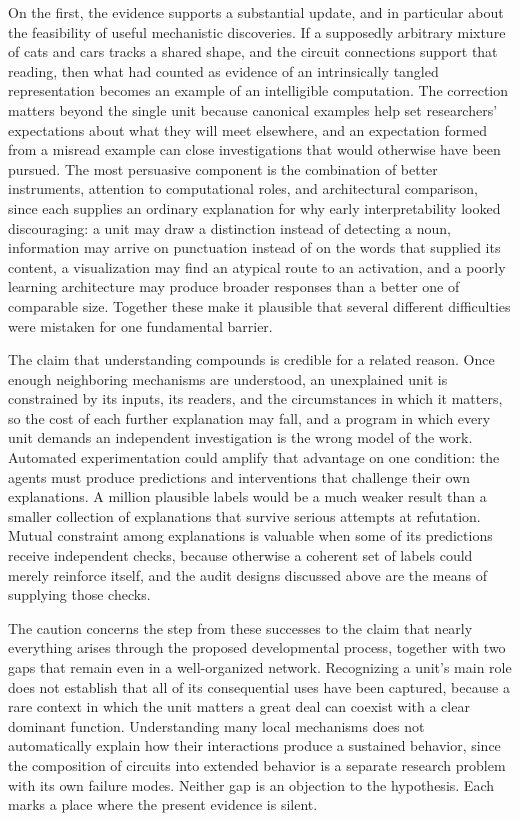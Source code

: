 \documentclass[11pt]{article}
\begin{document}
On the first, the evidence supports a substantial update, and in particular about the feasibility of useful mechanistic discoveries. If a supposedly arbitrary mixture of cats and cars tracks a shared shape, and the circuit connections support that reading, then what had counted as evidence of an intrinsically tangled representation becomes an example of an intelligible computation. The correction matters beyond the single unit because canonical examples help set researchers' expectations about what they will meet elsewhere, and an expectation formed from a misread example can close investigations that would otherwise have been pursued. The most persuasive component is the combination of better instruments, attention to computational roles, and architectural comparison, since each supplies an ordinary explanation for why early interpretability looked discouraging: a unit may draw a distinction instead of detecting a noun, information may arrive on punctuation instead of on the words that supplied its content, a visualization may find an atypical route to an activation, and a poorly learning architecture may produce broader responses than a better one of comparable size. Together these make it plausible that several different difficulties were mistaken for one fundamental barrier.

The claim that understanding compounds is credible for a related reason. Once enough neighboring mechanisms are understood, an unexplained unit is constrained by its inputs, its readers, and the circumstances in which it matters, so the cost of each further explanation may fall, and a program in which every unit demands an independent investigation is the wrong model of the work. Automated experimentation could amplify that advantage on one condition: the agents must produce predictions and interventions that challenge their own explanations. A million plausible labels would be a much weaker result than a smaller collection of explanations that survive serious attempts at refutation. Mutual constraint among explanations is valuable when some of its predictions receive independent checks, because otherwise a coherent set of labels could merely reinforce itself, and the audit designs discussed above are the means of supplying those checks.

The caution concerns the step from these successes to the claim that nearly everything arises through the proposed developmental process, together with two gaps that remain even in a well-organized network. Recognizing a unit's main role does not establish that all of its consequential uses have been captured, because a rare context in which the unit matters a great deal can coexist with a clear dominant function. Understanding many local mechanisms does not automatically explain how their interactions produce a sustained behavior, since the composition of circuits into extended behavior is a separate research problem with its own failure modes. Neither gap is an objection to the hypothesis. Each marks a place where the present evidence is silent.
\end{document}
